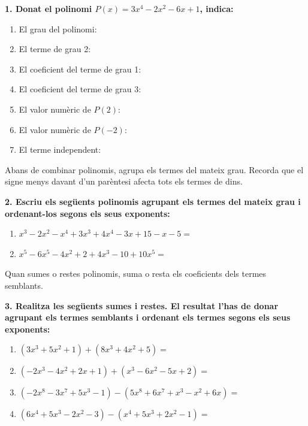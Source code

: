 \documentclass[12pt,a4paper]{article}
\begin{document}
\textbf{1. Donat el polinomi $P(x)=3x^4-2x^2-6x+1$, indica:}
\begin{enumerate}[label=\alph*)]
    \item El grau del polinomi: \dotfill\vspace{0.4cm}
    \item El terme de grau 2: \dotfill\vspace{0.4cm}
    \item El coeficient del terme de grau 1: \dotfill\vspace{0.4cm}
    \item El coeficient del terme de grau 3: \dotfill\vspace{0.4cm}
    \item El valor numèric de $P(2)$: \dotfill\vspace{0.6cm}
    \item El valor numèric de $P(-2)$: \dotfill\vspace{0.6cm}
    \item El terme independent: \dotfill\vspace{0.4cm}
\end{enumerate}

\begin{capsula}
Abans de combinar polinomis, agrupa els termes del mateix grau. Recorda que el signe menys davant d'un parèntesi afecta tots els termes de dins.
\end{capsula}

\textbf{2. Escriu els següents polinomis agrupant els termes del mateix grau i ordenant-los segons els seus exponents:}
\begin{enumerate}[label=\alph*)]
    \item $x^3-2x^2-x^4+3x^3+4x^4-3x+15-x-5 =$ \vspace{1cm}
    \item $x^5-6x^5-4x^2+2+4x^3-10+10x^5 =$ \vspace{1cm}
\end{enumerate}

\begin{capsula}
Quan sumes o restes polinomis, suma o resta els coeficients dels termes semblants.
\end{capsula}

\textbf{3. Realitza les següents sumes i restes. El resultat l’has de donar agrupant els termes semblants i ordenant els termes segons els seus exponents:}
\begin{enumerate}[label=\alph*)]
    \item $(3x^3+5x^2+1)+(8x^3+4x^2+5) =$ \vspace{1cm}
    \item $(-2x^3-4x^2+2x+1)+(x^3-6x^2-5x+2) =$ \vspace{1cm}
    \item $(-2x^8-3x^7+5x^3-1)-(5x^8+6x^7+x^3-x^2+6x) =$ \vspace{1cm}
    \item $(6x^4+5x^3-2x^2-3)-(x^4+5x^3+2x^2-1) =$ \vspace{1cm}
\end{enumerate}
\end{document}
